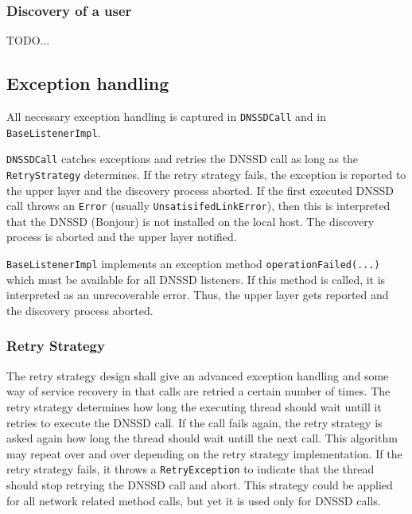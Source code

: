 \subsubsection{Discovery of a user}
TODO...


\subsection{Exception handling}
All necessary exception handling is captured in \texttt{DNSSDCall} and in \texttt{BaseListenerImpl}. 

\texttt{DNSSDCall} catches exceptions and retries the DNSSD call as long as the \texttt{RetryStrategy} determines. If the retry strategy fails, the exception is reported to the upper layer and the discovery process aborted. If the first executed DNSSD call throws an \texttt{Error} (usually \texttt{UnsatisifedLinkError}), then this is interpreted that the DNSSD (Bonjour) is not installed on the local host. The discovery process is aborted and the upper layer notified.

\texttt{BaseListenerImpl} implements an exception method \texttt{operationFailed(...)} which must be available for all DNSSD listeners. If this method is called, it is interpreted as an unrecoverable error. Thus, the upper layer gets reported and the discovery process aborted.

\subsubsection{Retry Strategy}
The retry strategy design shall give an advanced exception handling and some way of service recovery in that calls are retried a certain number of times. The retry strategy determines how long the executing thread should wait untill it retries to execute the DNSSD call. If the call fails again, the retry strategy is asked again how long the thread should wait untill the next call. This algorithm may repeat over and over depending on the retry strategy implementation. If the retry strategy fails, it throws a \texttt{RetryException} to indicate that the thread should stop retrying the DNSSD call and abort. This strategy could be applied for all network related method calls, but yet it is used only for DNSSD calls. 

